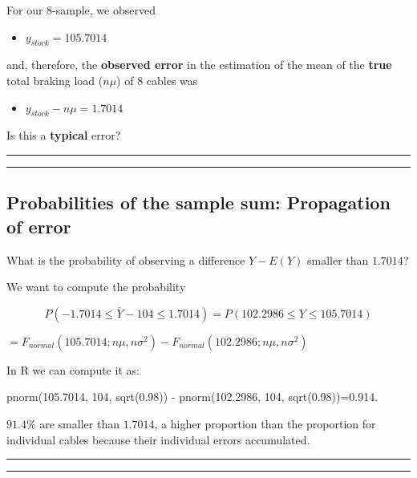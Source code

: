 \documentclass[
]{book}
\providecommand{\tightlist}{%
  \setlength{\itemsep}{0pt}\setlength{\parskip}{0pt}}
\begin{document}
For our \(8\)-sample, we observed

\begin{itemize}
\tightlist
\item
  \(y_{stock}=105.7014\)
\end{itemize}

and, therefore, the \textbf{observed error} in the estimation of the mean of the \textbf{true} total braking load (\(n\mu\)) of \(8\) cables was

\begin{itemize}
\tightlist
\item
  \(y_{stock}-n\mu= 1.7014\)
\end{itemize}

Is this a \textbf{typical} error?

\begin{center}\rule{0.5\linewidth}{0.5pt}\end{center}

\begin{center}\rule{0.5\linewidth}{0.5pt}\end{center}

\hypertarget{probabilities-of-the-sample-sum-propagation-of-error}{%
\subsection{Probabilities of the sample sum: Propagation of error}\label{probabilities-of-the-sample-sum-propagation-of-error}}

What is the probability of observing a difference \(Y-E(Y)\) smaller than \(1.7014\)?

We want to compute the probability

\[P(-1.7014 \leq \bar{Y} - 104 \leq 1.7014)=P(102.2986 \leq Y \leq 105.7014)\]

\(=F_{normal}(105.7014; n\mu, n\sigma^2)-F_{normal}(102.2986; n\mu, n\sigma^2)\)

In R we can compute it as:

pnorm(105.7014, 104, sqrt(0.98)) - pnorm(102.2986, 104, sqrt(0.98))=0.914.

\(91.4\%\) are smaller than \(1.7014\), a higher proportion than the proportion for individual cables because their individual errors accumulated.

\begin{center}\rule{0.5\linewidth}{0.5pt}\end{center}

\begin{center}\rule{0.5\linewidth}{0.5pt}\end{center}
\end{document}
